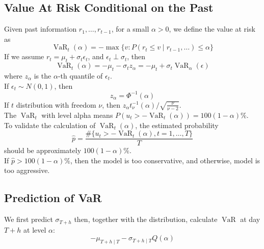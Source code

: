 \documentclass[12pt]{article}
\theoremstyle{definition}
\DeclareMathOperator{\VaR}{VaR}
\begin{document}
\subsection{Value At Risk Conditional on the Past}
Given past information $r_1, \ldots, r_{t-1}$, for a small $\alpha>0$, we define the value at risk as
\[
\VaR_t(\alpha) = - \max\{v: P(r_t\leq v\mid r_{t-1}, \ldots) \leq \alpha\}
\]
If we assume $r_t = \mu_t + \sigma_t \epsilon_t$, and $\epsilon_t\perp \sigma_t$, then
\[
\VaR_t(\alpha) = -\mu_t -\sigma_tz_{\alpha} = -\mu_t +\sigma_t \VaR_\alpha(\epsilon)
\]
where $z_\alpha$ is the $\alpha$-th quantile of $\epsilon_t$.\\
If $\epsilon_t\sim N(0,1)$, then
\[
z_\alpha = \Phi^{-1}(\alpha)
\]
If $t$ distribution with freedom $\nu$, then $z_\alpha t_\nu^{-1}(\alpha)/\sqrt{\frac{\nu}{\nu - 2}}$.\\
The $\VaR_{t}$ with level alpha means $P(u_t>-\VaR_t(\alpha)) = 100(1-\alpha)\%$.\\
To validate the calculation of $\VaR_t(\alpha)$, the estimated probability
\[
\hat{p} = \frac{\#\{u_t>-\VaR_t(\alpha), t = 1,\ldots, T\}}{T}
\]
should be approximately $100(1-\alpha)\%$.\\
If $\hat{p}> 100(1-\alpha)\%$, then the model is too conservative, and otherwise, model is too aggressive.\\
\subsection{Prediction of VaR}
We first predict $\sigma_{T+h}$ then, together with the distribution, calculate $\VaR$ at day $T+h$ at level $\alpha$:
\[
-\mu_{T+h\mid T} - \sigma_{T+h\mid T}Q(\alpha)
\]
\end{document}

